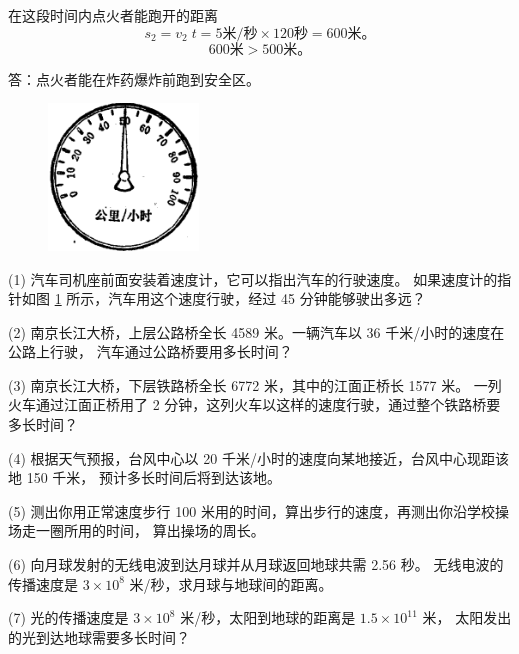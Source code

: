 在这段时间内点火者能跑开的距离
$$ s_2 = v_2\;t = 5 \text{米/秒} \times 120 \text{秒} = 600 \text{米。} $$
$$ 600 \text{米} > 500 \text{米。} $$

答：点火者能在炸药爆炸前跑到安全区。

\lianxi

\begin{figure}
    \centering
    \includegraphics[width=4cm]{../pic/czwl1-ch3-4}
    \caption{}\label{fig:3-4}
\end{figure}

(1) 汽车司机座前面安装着速度计，它可以指出汽车的行驶速度。
如果速度计的指针如图 \ref{fig:3-4} 所示，汽车用这个速度行驶，经过 45 分钟能够驶出多远？

(2) 南京长江大桥，上层公路桥全长 4589 米。一辆汽车以 36 千米/小时的速度在公路上行驶，
汽车通过公路桥要用多长时间？

(3) 南京长江大桥，下层铁路桥全长 6772 米，其中的江面正桥长 1577 米。
一列火车通过江面正桥用了 2 分钟，这列火车以这样的速度行驶，通过整个铁路桥要多长时间？

(4) 根据天气预报，台风中心以 20 千米/小时的速度向某地接近，台风中心现距该地 150 千米，
预计多长时间后将到达该地。

(5) 测出你用正常速度步行 100 米用的时间，算出步行的速度，再测出你沿学校操场走一圈所用的时间，
算出操场的周长。

(6) 向月球发射的无线电波到达月球并从月球返回地球共需 2.56 秒。
无线电波的传播速度是 $3 \times 10^8$ 米/秒，求月球与地球间的距离。

(7) 光的传播速度是 $3 \times 10^8$ 米/秒，太阳到地球的距离是 $1.5 \times 10^{11}$ 米，
太阳发出的光到达地球需要多长时间？

